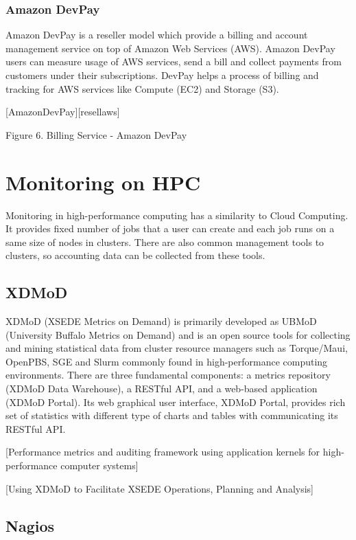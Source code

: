 \documentclass{sig-alternate}
\begin{document}
\subsubsection{Amazon DevPay}

Amazon DevPay is a reseller model which provide a billing and account management service on top of Amazon Web Services (AWS). Amazon DevPay users can measure usage of AWS services, send a bill and collect payments from customers under their subscriptions. DevPay helps a process of billing and tracking for AWS services like Compute (EC2) and Storage (S3).

[AmazonDevPay][resellaws]

Figure 6. Billing Service - Amazon DevPay

\section{Monitoring on HPC}

Monitoring in high-performance computing has a similarity to Cloud Computing. It provides fixed number of jobs that a user can create and each job runs on a same size of nodes in clusters. There are also common management tools to clusters, so accounting data can be collected from these tools.

\subsection{XDMoD}

XDMoD (XSEDE Metrics on Demand) is primarily developed as UBMoD (University Buffalo Metrics on Demand) and is an open source tools for collecting and mining statistical data from cluster resource managers such as Torque/Maui, OpenPBS, SGE and Slurm commonly found in high-performance computing environments. There are three fundamental components: a metrics repository (XDMoD Data Warehouse), a RESTful API, and a web-based application (XDMoD Portal). Its web graphical user interface, XDMoD Portal, provides rich set of statistics with different type of charts and tables with communicating its RESTful API.

[Performance metrics and auditing framework using application kernels for high-performance computer systems]

[Using XDMoD to Facilitate XSEDE Operations, Planning and Analysis]

\subsection{Nagios}
\end{document}

